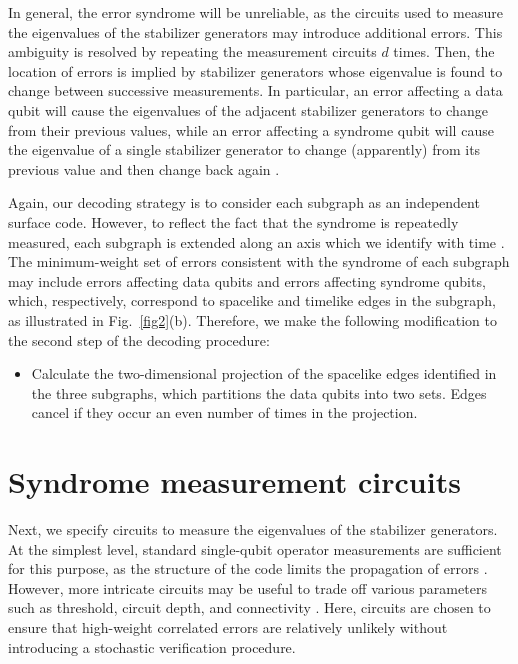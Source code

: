 \documentclass[letterpaper,showpacs,superscriptaddress,twocolumn,aps,prl]{revtex4-1}
\begin{document}
In general, the error syndrome will be unreliable, as the circuits used to measure the eigenvalues of the stabilizer generators may introduce additional errors. This ambiguity is resolved by repeating the measurement circuits $d$ times. Then, the location of errors is implied by stabilizer generators whose eigenvalue is found to change between successive measurements. In particular, an error affecting a data qubit will cause the eigenvalues of the adjacent stabilizer generators to change from their previous values, while an error affecting a syndrome qubit will cause the eigenvalue of a single stabilizer generator to change (apparently) from its previous value and then change back again \cite{Dennis2002,Wang10}.

Again, our decoding strategy is to consider each subgraph as an independent surface code. However, to reflect the fact that the syndrome is repeatedly measured, each subgraph is extended along an axis which we identify with time \cite{Dennis2002,Wang10}. The minimum-weight set of errors consistent with the syndrome of each subgraph may include errors affecting data qubits and errors affecting syndrome qubits, which, respectively, correspond to spacelike and timelike edges in the subgraph, as illustrated in Fig.~\ref{fig2}(b). Therefore, we make the following modification to the second step of the decoding procedure:
\begin{itemize}
\item[2$^\prime$.] Calculate the two-dimensional projection of the spacelike edges identified in the three subgraphs, which partitions the data qubits into two sets. Edges cancel if they occur an even number of times in the projection.
\end{itemize}

\section{Syndrome measurement circuits}
Next, we specify circuits to measure the eigenvalues of the stabilizer generators. At the simplest level, standard single-qubit operator measurements are sufficient for this purpose, as the structure of the code limits the propagation of errors \cite{Landahl1}. However, more intricate circuits may be useful to trade off various parameters such as threshold, circuit depth, and connectivity \cite{Fowler11}. Here, circuits are chosen to ensure that high-weight correlated errors are relatively unlikely without introducing a stochastic verification procedure. 
\end{document}
